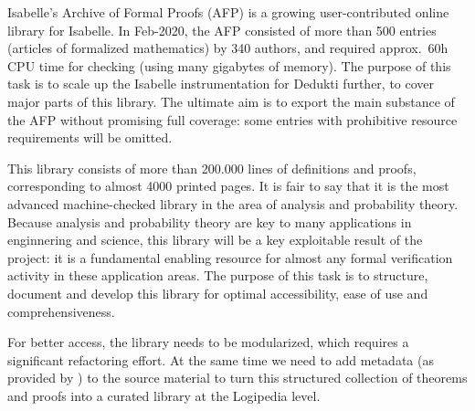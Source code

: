 \begin{workpackage}[id=libraries,type=RTD,wphases=1-48,
  short={Large libraries},%
  title={Large libraries},
  activity=na,
  lead=Tum,
  StrRM=18,
  ChaRM=12,
  TumRM=27]
\begin{tasklist}


\begin{task}[
  id=afp,
  title=Isabelle's Archive of Formal Proofs,
  shorttitle=Isa. AFP,
  lead=Tum,
  TumRM=3,
  wphases=13-18]
  Isabelle's Archive of Formal Proofs (AFP) is a
growing user-contributed online library for Isabelle. In Feb-2020, the
AFP consisted of more than 500 entries (articles of formalized
mathematics) by 340 authors, and required approx.\ 60h CPU time for
checking (using many gigabytes of memory).  The purpose of this task
is to scale up the Isabelle instrumentation for Dedukti further, to
cover major parts of this library. The ultimate aim is to export the main
substance of the AFP without promising full coverage: some entries
with prohibitive resource requirements will be omitted.
\end{task}

\begin{task}[
  id=isaAnalysisProb,
  title=The Isabelle Analysis \& Probability Theory library,
  shorttitle=Isa. A\&P,
  lead=Tum,
  TumRM=24,
  wphases=1-24]
%
  This library consists of more than 200.000 lines
  of definitions and proofs, corresponding to almost 4000 printed
  pages. It is fair to say that it is the most advanced
  machine-checked library in the area of analysis and probability
  theory. Because analysis and probability theory are key to many
  applications in enginnering and science, this library will be a key
  exploitable result of the project: it is a fundamental enabling
  resource for almost any formal verification activity in these
  application areas. The purpose of this task is to structure,
  document and develop this library for optimal accessibility, ease of
  use and comprehensiveness.

For better access, the library needs to be modularized, which requires
a significant refactoring effort.  At the same time we need to add
metadata (as provided by ) to the source material
to turn this structured collection of theorems and proofs into a
curated library at the Logipedia level.


\end{task}
\end{tasklist}
\end{workpackage}

